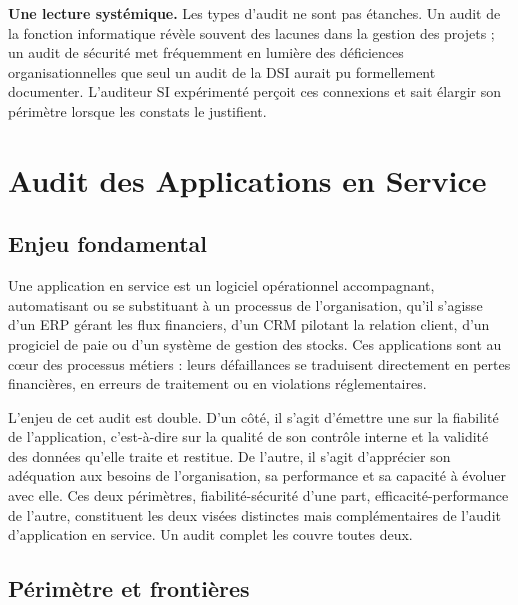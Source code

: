 \begin{boxinfo}
\textbf{Une lecture systémique.} Les types d'audit ne sont pas étanches. Un audit de la fonction informatique révèle souvent des lacunes dans la gestion des projets ; un audit de sécurité met fréquemment en lumière des déficiences organisationnelles que seul un audit de la DSI aurait pu formellement documenter. L'auditeur SI expérimenté perçoit ces connexions et sait élargir son périmètre lorsque les constats le justifient.
\end{boxinfo}


\section{Audit des Applications en Service}

\subsection{Enjeu fondamental}

Une application en service est un logiciel opérationnel accompagnant, automatisant ou se substituant à un processus de l'organisation, qu'il s'agisse d'un ERP gérant les flux financiers, d'un CRM pilotant la relation client, d'un progiciel de paie ou d'un système de gestion des stocks. Ces applications sont au cœur des processus métiers : leurs défaillances se traduisent directement en pertes financières, en erreurs de traitement ou en violations réglementaires.

L'enjeu de cet audit est double. D'un côté, il s'agit d'émettre une  sur la fiabilité de l'application, c'est-à-dire sur la qualité de son contrôle interne et la validité des données qu'elle traite et restitue. De l'autre, il s'agit d'apprécier son adéquation aux besoins de l'organisation, sa performance et sa capacité à évoluer avec elle. Ces deux périmètres, fiabilité-sécurité d'une part, efficacité-performance de l'autre, constituent les deux visées distinctes mais complémentaires de l'audit d'application en service. Un audit complet les couvre toutes deux.

\subsection{Périmètre et frontières}

